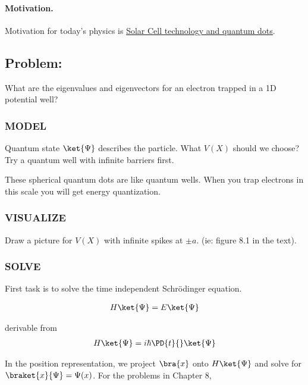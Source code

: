 %
%

\paragraph{Motivation.}  Motivation for today's physics is \href{http://physicsworld.com/cws/article/news/38046}{Solar Cell technology and quantum dots}.

\subsection{Problem:}
What are the eigenvalues and eigenvectors for an electron trapped in a 1D potential well?

\subsubsection{MODEL}
Quantum state $\ket{\Psi}$ describes the particle.  What $V(X)$ should we choose?  Try a quantum well with infinite barriers first.

These spherical quantum dots are like quantum wells.  When you trap electrons in this scale you will get energy quantization.

\subsubsection{VISUALIZE}
Draw a picture for $V(X)$ with infinite spikes at $\pm a$. (ie: figure 8.1 in the text).

\subsubsection{SOLVE}
First task is to solve the time independent Schr\"{o}dinger equation.

\begin{align}\label{eqn:PHY356Lecture9:1}
H \ket{\Psi} = E \ket{\Psi}
\end{align}

derivable from
\begin{align}\label{eqn:PHY356Lecture9:2}
H \ket{\Psi} = i \hbar \PD{t}{} \ket{\Psi}
\end{align}

In the position representation, we project $\bra{x}$ onto $H \ket{\Psi}$ and solve for $\braket{x}{\Psi} = \Psi(x)$.  For the problems in Chapter 8,

